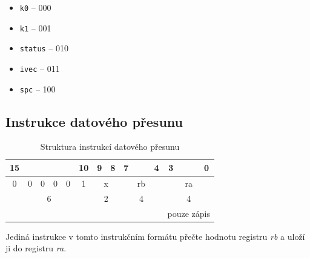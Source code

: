 \documentclass[
  digital, %
  color,   %
  table,   %
  twoside, %
  nolof,   %
  nolot,   %
]{fithesis3}
\begin{document}
\begin{itemize}
  \item \texttt{k0} -- 000
  \item \texttt{k1} -- 001
  \item \texttt{status} -- 010
  \item \texttt{ivec} -- 011
  \item \texttt{spc} -- 100
\end{itemize} \newpage

\subsection{Instrukce datového přesunu}
\begin{table}[H]
\caption{Struktura instrukcí datového přesunu}
\begin{tabular}{ccccccclccllcccc}
15 &  &  &  &  & 10 & 9 & \multicolumn{1}{c}{8} & 7 &  & \multicolumn{1}{c}{} & \multicolumn{1}{c}{4} & 3 &  &  & 0 \\ \hline
\multicolumn{1}{|c}{0} & 0 & 0 & 0 & 0 & \multicolumn{1}{c|}{1} & \multicolumn{2}{c|}{x} & \multicolumn{4}{c|}{rb} & \multicolumn{4}{c|}{ra} \\ \hline
\multicolumn{6}{c}{{\color[HTML]{656565} 6}} & \multicolumn{2}{c}{{\color[HTML]{656565} 2}} & \multicolumn{4}{c}{{\color[HTML]{656565} 4}} & \multicolumn{4}{c}{{\color[HTML]{656565} 4}} \\
\multicolumn{1}{l}{} & \multicolumn{1}{l}{} & \multicolumn{1}{l}{} & \multicolumn{1}{l}{} & \multicolumn{1}{l}{} & \multicolumn{1}{l}{} & \multicolumn{1}{l}{} &  & \multicolumn{1}{l}{} &  &  &  & \multicolumn{4}{c}{pouze zápis}
\end{tabular}
\end{table}

Jediná instrukce v tomto instrukčním formátu přečte hodnotu registru \textit{rb} a uloží ji do registru \textit{ra}.
\end{document}
